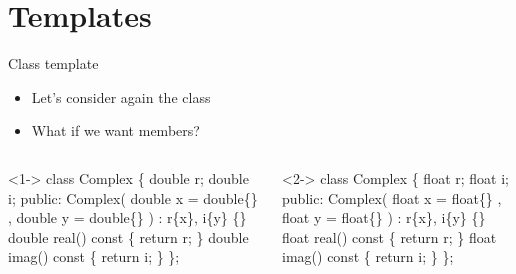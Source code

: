 

\section{Templates}

\begin{frame}[fragile]{Class template}

  \begin{itemize}
  \item<1-> Let's consider again the  class
  \item<2-> What if we want  members?
  \end{itemize}

  \begin{columns}[t]

  \begin{column}{.5\textwidth}
    \begin{codeblock}<1->{
class Complex \{
  \alert{double} r;
  \alert{double} i;
 public:
  Complex(
      \alert{double} x = \alert{double}\{\}
    , \alert{double} y = \alert{double}\{\}
  ) : r\{x\}, i\{y\} \{\}
  \alert{double} real() const \{ return r; \}
  \alert{double} imag() const \{ return i; \}
\};}\end{codeblock}

  \end{column}
  \begin{column}{.5\textwidth}
    \begin{codeblock}<2->{
class Complex \{
  \alert{float} r;
  \alert{float} i;
 public:
  Complex(
      \alert{float} x = \alert{float}\{\}
    , \alert{float} y = \alert{float}\{\}
  ) : r\{x\}, i\{y\} \{\}
  \alert{float} real() const \{ return r; \}
  \alert{float} imag() const \{ return i; \}
\};}\end{codeblock}

  \end{column}

  \end{columns}

\end{frame}

